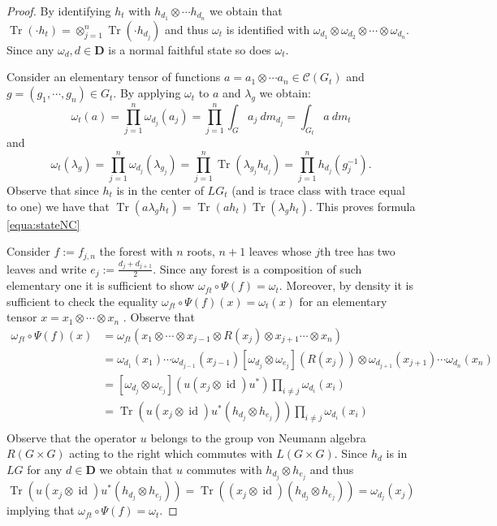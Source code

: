 \documentclass[a4paper,12pt]{amsart}
\numberwithin{equation}{section}
\theoremstyle{definition}
\DeclareMathOperator{\id}{id}
\newcommand{\scrC}{\mathscr C}
\newcommand{\D}{\mathbf D}
\newcommand{\la}{\lambda}
\newcommand{\ot}{\otimes}\newcommand{\otmin}{\otimes_{\text{min}}}
\DeclareMathOperator{\Tr}{Tr}
\begin{document}
\begin{proof}
By identifying $h_t$ with $h_{d_1}\ot\cdots h_{d_n}$ we obtain that $\Tr(\cdot h_t) = \ot_{j=1}^n \Tr(\cdot h_{d_j})$ and thus $\omega_t$ is identified with $\omega_{d_1}\ot\omega_{d_2}\ot\cdots\ot\omega_{d_n}$.
Since any $\omega_d,d\in\D$ is a normal faithful state so does $\omega_t$.

Consider an elementary tensor of functions $a=a_1\ot\cdots a_n\in\scrC(G_t)$ and $g=(g_1,\cdots,g_n)\in G_t.$
By applying $\omega_t$ to $a$ and $\la_g$ we obtain:
$$\omega_t(a) = \prod_{j=1}^n \omega_{d_j}(a_j) = \prod_{j=1}^n \int_G a_j\ dm_{d_j} = \int_{G_t} a\ dm_t$$
and 
$$\omega_t(\la_g) = \prod_{j=1}^n \omega_{d_j}(\la_{g_j}) = \prod_{j=1}^n \Tr( \la_{g_j} h_{d_j}) = \prod_{j=1}^n h_{d_j}(g_j^{-1}).$$
Observe that since $h_t$ is in the center of $LG_t$ (and is trace class with trace equal to one) we have that $\Tr( a \la_g h_t) = \Tr(a h_t) \Tr(\la_g h_t)$. 
This proves formula \eqref{equa:stateNC}

Consider $f:= f_{j,n}$ the forest with $n$ roots, $n+1$ leaves whose $j$th tree has two leaves and write $e_j:= \tfrac{d_j + d_{j+1}}{2}.$ 
Since any forest is a composition of such elementary one it is sufficient to show $\omega_{ft} \circ \Psi(f)=\omega_t.$
Moreover, by density it is sufficient to check the equality $\omega_{ft} \circ \Psi(f)(x)= \omega_t(x)$ for an elementary tensor $x=x_1\ot\cdots\ot x_n$ .
Observe that 
\begin{align*}
\omega_{ft} \circ \Psi(f)(x) & = \omega_{ft} (x_1\ot\cdots\ot x_{j-1} \ot R(x_j) \ot x_{j+1}\cdots\ot x_n)\\
& = \omega_{d_1}(x_1) \cdots \omega_{d_{j-1}} (x_{j-1}) [\omega_{d_j} \ot \omega_{e_j}]( R(x_j)) 
\ot \omega_{d_{j+1}}(x_{j+1}) \cdots \omega_{d_n}(x_n)\\
& =  [\omega_{d_j} \ot \omega_{e_j}]( u (x_j\ot \id) u^*) \prod_{i\neq j} \omega_{d_i}(x_i)\\
& =  \Tr ( u (x_j\ot \id) u^* (h_{d_j} \ot h_{e_j}) ) \prod_{i\neq j} \omega_{d_i}(x_i)\\
\end{align*}
Observe that the operator $u$ belongs to the group von Neumann algebra $R(G\times G)$ acting to the right which commutes with $L(G\times G).$
Since $h_d$ is in $LG$ for any $d\in\D$ we obtain that $u$ commutes with $h_{d_j} \ot h_{e_j}$ and thus
$$\Tr ( u (x_j\ot \id) u^* (h_{d_j} \ot h_{e_j}) ) = \Tr ( (x_j\ot \id)  (h_{d_j} \ot h_{e_j}) ) = \omega_{d_j}(x_j)$$
implying that $\omega_{ft}\circ \Psi(f) = \omega_t.$
\end{proof}
\end{document}
